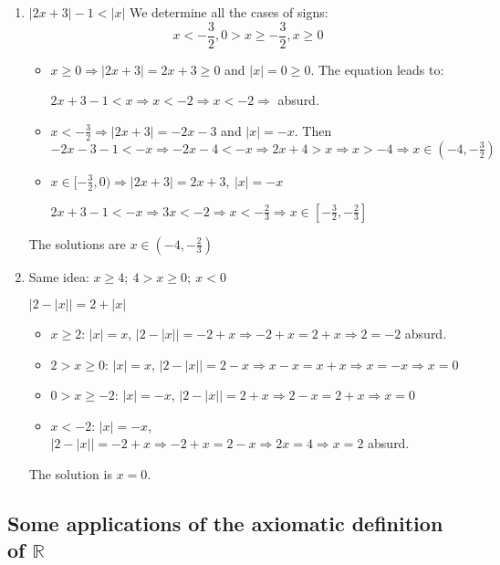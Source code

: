 \documentclass[12pt, a4paper]{book}
\begin{document}
\begin{exmp}
  \begin{enumerate}[label=\emph{\alph*})]
    \item $|2x+3|-1 < |x|$
    We determine all the cases of signs:
    \[
      \displaystyle x < -\frac{3}{2}, 0>x\geq -\frac{3}{2}, x\geq 0
    \]
    \begin{itemize}
      \item $x\geq 0 \Rightarrow |2x+3| = 2x+3 \geq 0$ and $|x|=0\geq 0$. The equation leads to:

      $2x+3-1 < x \Rightarrow x < -2 \Rightarrow x < -2 \Rightarrow$ absurd.
      \item $x<-\frac{3}{2} \Rightarrow |2x+3|=-2x-3$ and $|x|=-x$. Then $-2x-3-1 < -x \Rightarrow -2x-4 < -x \Rightarrow 2x+4>x \Rightarrow x>-4 \Rightarrow x\in(-4,-\frac{3}{2})$
      \item $x\in[-\frac{3}{2},0) \Rightarrow |2x+3|=2x+3,\ |x|=-x$

      $2x+3-1 < -x \Rightarrow 3x < -2 \Rightarrow x< -\frac{2}{3} \Rightarrow x\in[-\frac{3}{2}, -\frac{2}{3}]$
    \end{itemize}
    The solutions are $\displaystyle x\in(-4,-\frac{2}{3})$

    \item Same idea: $x\geq 4;\ 4>x\geq 0;\ x<0$
    
    $|2-|x|| = 2+|x|$
    \begin{itemize}
      \item $x\geq 2$: $|x|=x$, $|2-|x|| = -2+x \Rightarrow -2+x=2+x \Rightarrow 2=-2$ absurd.
      \item $2>x\geq 0$: $|x|=x$, $|2-|x||=2-x \Rightarrow x-x=x+x \Rightarrow x=-x \Rightarrow x=0$
      \item $0>x\geq -2$: $|x|=-x$, $|2-|x|| = 2+x \Rightarrow 2-x=2+x \Rightarrow x=0$
      \item $x<-2$: $|x|=-x$, $|2-|x|| = -2+x \Rightarrow -2+x=2-x \Rightarrow 2x=4 \Rightarrow x=2$ absurd.
    \end{itemize}
    The solution is $x=0$.
  \end{enumerate}
\end{exmp}

\subsection*{Some applications of the axiomatic definition of $\mathbb{R}$}
\end{document}
